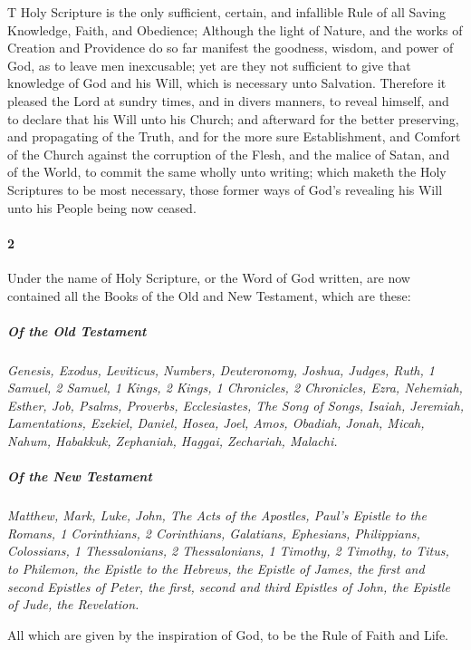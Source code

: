 \documentclass[
    paper=letterpaper,
    11pt,
    twoside,
    DIV=calc,
    openany
]{scrbook}
\makeatletter
\def\extractfirstletter#1#2@{#1}
\newcommand{\firstlettercommand}[1]{ \extractfirstletter#1@ }
\newcommand{\oldleadin}[2]{\lettrine[ante=\textbf{1},lines=2,lraise=0.1,findent=-0.3em,nindent=0.1em, slope=0em]{\color{red}\firstlettercommand{#2}}{\RemoveFirstLetter{#2}}}
\newcommand{\firstparagraph}{}
\makeatother
\begin{document}
\firstparagraph{} %
\oldleadin{THE}{The} Holy Scripture is the only sufficient, certain, and infallible \R{}Rule of all Saving Knowledge, Faith, and Obedience; Although the light \R{}of Nature, and the works of Creation and Providence do so far manifest the goodness, wisdom, and power of God, as to leave men inexcusable; yet are they not sufficient to give that knowledge of God and his Will, which is necessary unto Salvation. \R{}Therefore it pleased the Lord at sundry times, and in divers manners, to reveal himself, and to  declare that his Will unto his Church; and afterward for the better preserving, and propagating of the Truth, and for the more sure Establishment, and Comfort of the Church against the corruption of the Flesh, and the malice of Satan, and of the World, to commit the same wholly unto \R{}writing; which maketh the Holy Scriptures to be most necessary, those former ways of God’s revealing his Will unto his People being now ceased.

\footnotebegin
{}
\footnoteend

\paragraph{2} %
Under the name of Holy Scripture, or the Word of God written, are now contained all the Books of the Old and New Testament, which are these:

\subparagraph{Of the Old Testament}
\textit{Genesis, Exodus, Leviticus, Numbers, Deuteronomy, Joshua, Judges, Ruth, 1 Samuel, 2 Samuel, 1 Kings, 2 Kings, 1 Chronicles, 2 Chronicles, Ezra, Nehemiah, Esther, Job, Psalms, Proverbs, Ecclesiastes, The Song of Songs, Isaiah, Jeremiah, Lamentations, Ezekiel, Daniel, Hosea, Joel, Amos, Obadiah, Jonah, Micah, Nahum, Habakkuk, Zephaniah, Haggai, Zechariah, Malachi.}

\subparagraph{Of the New Testament}
\textit{Matthew, Mark, Luke, John, The Acts of the Apostles, Paul's Epistle to the Romans, 1 Corinthians, 2 Corinthians, Galatians, Ephesians, Philippians, Colossians, 1 Thessalonians, 2 Thessalonians, 1 Timothy, 2 Timothy, to Titus, to Philemon, the Epistle to the Hebrews, the Epistle of James, the first and second Epistles of Peter, the first, second and third Epistles of John, the Epistle of Jude, the Revelation.}

All which are given by the \R{}inspiration of God, to be the Rule of Faith and Life.
\end{document}
